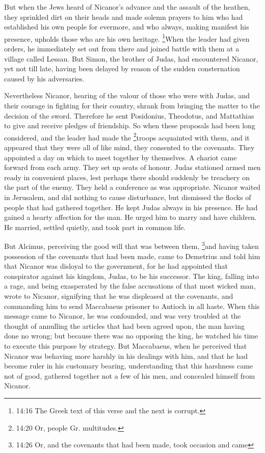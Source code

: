  But when the Jews heard of Nicanor's advance and the
assault of the heathen, they sprinkled dirt on their heads and made
solemn prayers to him who had established his own people for evermore,
and who always, making manifest his presence, upholds those who are his
own heritage.  \footnote{14:16 The Greek text of this verse
  and the next is corrupt.}When the leader had given orders, he
immediately set out from there and joined battle with them at a village
called Lessau.  But Simon, the brother of Judas, had
encountered Nicanor, yet not till late, having been delayed by reason of
the sudden consternation caused by his adversaries.

 Nevertheless Nicanor, hearing of the valour of those who
were with Judas, and their courage in fighting for their country, shrank
from bringing the matter to the decision of the sword. 
Therefore he sent Posidonius, Theodotus, and Mattathias to give and
receive pledges of friendship.  So when these proposals had
been long considered, and the leader had made the \footnote{14:20 Or,
  people Gr. multitudes.}troops acquainted with them, and it appeared
that they were all of like mind, they consented to the covenants.
 They appointed a day on which to meet together by
themselves. A chariot came forward from each army. They set up seats of
honour.  Judas stationed armed men ready in convenient
places, lest perhaps there should suddenly be treachery on the part of
the enemy. They held a conference as was appropriate. 
Nicanor waited in Jerusalem, and did nothing to cause disturbance, but
dismissed the flocks of people that had gathered together. 
He kept Judas always in his presence. He had gained a hearty affection
for the man.  He urged him to marry and have children. He
married, settled quietly, and took part in common life.

 But Alcimus, perceiving the good will that was between
them, \footnote{14:26 Or, and the covenants that had been made, took
  occasion and came}and having taken possession of the covenants that
had been made, came to Demetrius and told him that Nicanor was disloyal
to the government, for he had appointed that conspirator against his
kingdom, Judas, to be his successor.  The king, falling
into a rage, and being exasperated by the false accusations of that most
wicked man, wrote to Nicanor, signifying that he was displeased at the
covenants, and commanding him to send Maccabaeus prisoner to Antioch in
all haste.  When this message came to Nicanor, he was
confounded, and was very troubled at the thought of annulling the
articles that had been agreed upon, the man having done no wrong;
 but because there was no opposing the king, he watched his
time to execute this purpose by strategy.  But Maccabaeus,
when he perceived that Nicanor was behaving more harshly in his dealings
with him, and that he had become ruler in his customary bearing,
understanding that this harshness came not of good, gathered together
not a few of his men, and concealed himself from Nicanor.

